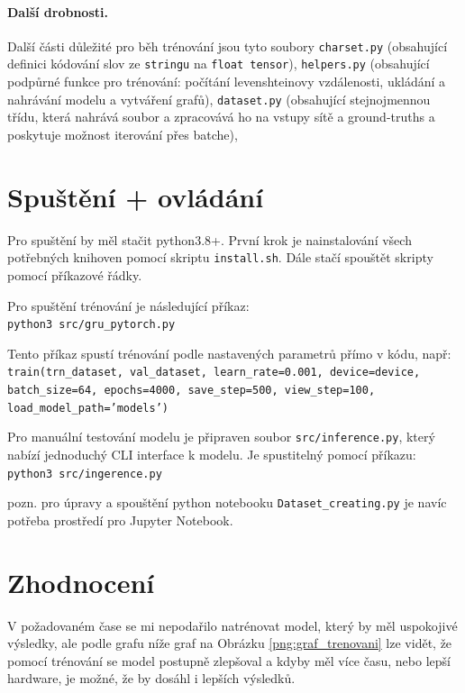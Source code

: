 \documentclass[a4paper]{article}
\theoremstyle{definition}
\begin{document}
\paragraph{Další drobnosti.}
Další části důležité pro běh trénování jsou tyto soubory \texttt{charset.py} (obsahující definici kódování slov ze \texttt{stringu} na \texttt{float tensor}), \texttt{helpers.py} (obsahující podpůrné funkce pro trénování: počítání levenshteinovy vzdálenosti, ukládání a nahrávání modelu a vytváření grafů), \texttt{dataset.py} (obsahující stejnojmennou třídu, která nahrává soubor a zpracovává ho na vstupy sítě a ground-truths a poskytuje možnost iterování přes batche),


\section{Spuštění + ovládání}

Pro spuštění by měl stačit python3.8+. První krok je nainstalování všech potřebných knihoven pomocí skriptu \texttt{install.sh}. Dále stačí spouštět skripty pomocí příkazové řádky.

Pro spuštění trénování je následující příkaz: \\
\texttt{python3 src/gru\_pytorch.py}

Tento příkaz spustí trénování podle nastavených parametrů přímo v kódu, např: \\
\texttt{train(trn\_dataset, val\_dataset, learn\_rate=0.001, device=device, \\
batch\_size=64, epochs=4000, save\_step=500, view\_step=100, \\
load\_model\_path='models')}

Pro manuální testování modelu je připraven soubor \texttt{src/inference.py}, který nabízí jednoduchý CLI interface k modelu. Je spustitelný pomocí příkazu: \\
\texttt{python3 src/ingerence.py}

pozn. pro úpravy a spouštění python notebooku \texttt{Dataset\_creating.py} je navíc potřeba prostředí pro Jupyter Notebook.

\section{Zhodnocení}
V požadovaném čase se mi nepodařilo natrénovat model, který by měl uspokojivé výsledky, ale podle grafu níže graf na Obrázku \ref{png:graf_trenovani} lze vidět, že pomocí trénování se model postupně zlepšoval a kdyby měl více času, nebo lepší hardware, je možné, že by dosáhl i lepších výsledků.
\end{document}
